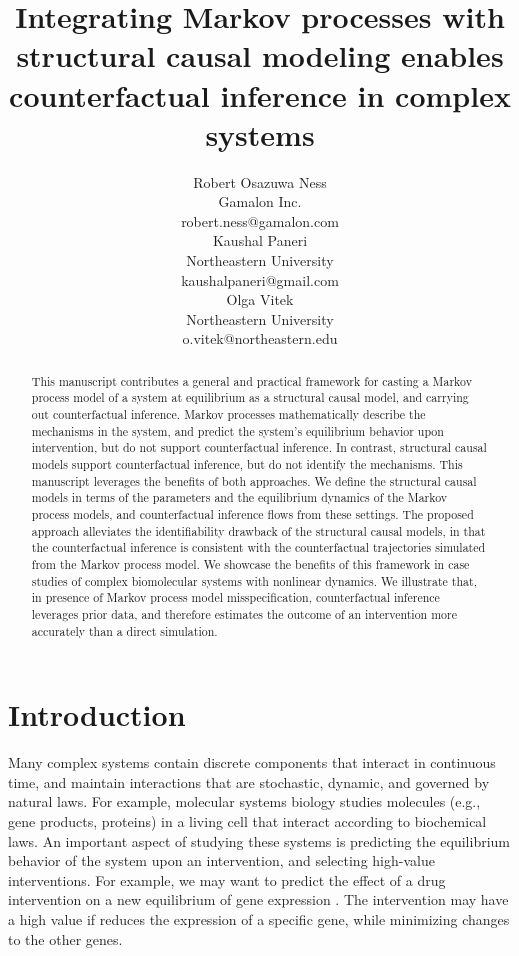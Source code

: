 \documentclass{article}
\title{\Large Integrating Markov processes with structural causal modeling enables counterfactual inference in complex systems}
\author{%
  Robert Osazuwa Ness\\
  Gamalon Inc.\\
  robert.ness@gamalon.com\\
  \And
  Kaushal Paneri\\
  Northeastern University\\
  kaushalpaneri@gmail.com\\
  \And
  Olga Vitek\\
  Northeastern University\\
  o.vitek@northeastern.edu\\
}
\def\todo#1{{\color{red}[#1]}}
\begin{document}
\vspace{-0.5cm}
\maketitle

\vspace{-0.5cm}
\begin{abstract}

This manuscript contributes a general and practical framework for casting a Markov process model of a system at equilibrium as a structural causal model, and carrying out counterfactual inference. Markov processes mathematically describe the mechanisms in the system, and predict the system's equilibrium behavior upon intervention, but do not support counterfactual inference. In contrast, structural causal models support counterfactual inference, but do not identify the mechanisms. This manuscript leverages the benefits of both approaches. We define the structural causal models in terms of the parameters and the equilibrium dynamics of the Markov process models, and counterfactual inference flows from these settings. The proposed approach alleviates the identifiability drawback of the structural causal models, in that the counterfactual inference is consistent with the counterfactual trajectories simulated from the Markov process model. We showcase the benefits of this framework in case studies of complex biomolecular systems with nonlinear dynamics. We illustrate that, in presence of Markov process model misspecification, counterfactual inference leverages prior data, and therefore estimates the outcome of an intervention more accurately than a direct simulation.

\end{abstract}

\vspace{-0.5cm}
\section{Introduction}
\vspace{-0.2cm}



Many complex systems contain discrete components that interact in continuous time, and maintain interactions that are stochastic, dynamic, and governed by natural laws. For example, molecular systems biology studies molecules (e.g., gene products, proteins) in a living cell that interact according to biochemical laws. An important aspect of studying these systems is predicting the equilibrium behavior of the system upon an intervention, and selecting high-value interventions. For example, we may want to predict the effect of a drug intervention on a new equilibrium of gene expression \cite{alon2006introduction,tyson2003sniffers}. The intervention may have a high value if reduces the expression of a specific gene, while minimizing changes to the other genes.
\end{document}
